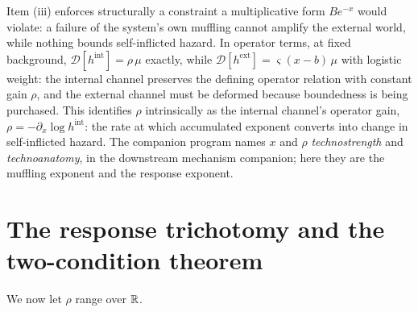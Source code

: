 \begin{remark}
Item (iii) enforces structurally a constraint a multiplicative form
$Be^{-x}$ would violate: a failure of the system's own muffling cannot
amplify the external world, while nothing bounds self-inflicted
hazard. In operator terms, at fixed background,
$\mathcal D[h^{\mathrm{int}}]=\rho\,\mu$ exactly, while
$\mathcal D[h^{\mathrm{ext}}]=\varsigma(x-b)\,\mu$ with logistic
weight: the internal channel preserves the defining operator relation
with constant gain $\rho$, and the external channel must be deformed
because boundedness is being purchased. This identifies $\rho$
intrinsically as the internal channel's operator gain,
$\rho=-\partial_x\log h^{\mathrm{int}}$: the rate at which accumulated
exponent converts into change in self-inflicted hazard. The companion
program names $x$ and $\rho$ \emph{technostrength} and
\emph{technoanatomy}, in the downstream mechanism companion; here they
are the muffling
exponent and the response exponent.
\end{remark}

\section{The response trichotomy and the two-condition theorem}
\label{sec:trichotomy}

We now let $\rho$ range over $\mathbb{R}$.

